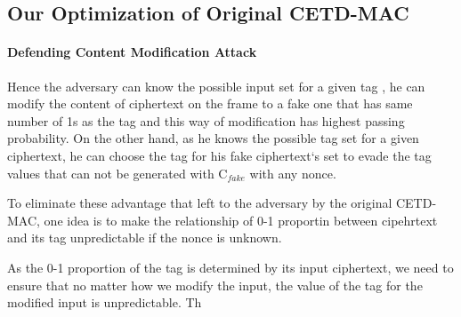 \subsection{Our Optimization of Original CETD-MAC}
\paragraph{Defending Content Modification Attack}
Hence the adversary can know the possible input set for a given tag , he can modify the content of ciphertext on the frame to a fake one that has same number of 1s as the tag and this way of modification has highest passing probability. On the other hand, as he knows the possible tag set for a given ciphertext, he can choose the tag for his fake ciphertext`s set to evade the tag values that can not be generated with C$_{fake}$ with any nonce. 

To eliminate these advantage that left to the adversary by the original CETD-MAC, one idea is to make the relationship of 0-1 proportin between cipehrtext and its tag unpredictable if the nonce is unknown. 

As the 0-1 proportion of the tag is determined by its input ciphertext, we need to ensure that no matter how we modify the input, the value of the tag for the modified input is unpredictable. Th 

